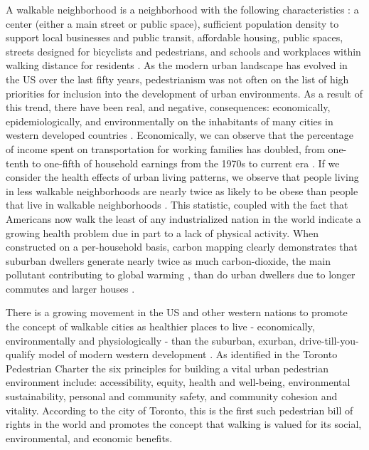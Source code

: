 \documentclass{llncs}
\begin{document}
A walkable neighborhood is a neighborhood with the following characteristics : a center (either a main street or public space), sufficient population density to support local businesses and public transit, affordable housing, public spaces, streets designed for bicyclists and pedestrians, and schools and workplaces within walking distance for residents \cite{wal2018walkable}. As the modern urban landscape has evolved in the US over the last fifty years, pedestrianism was not often on the list of high priorities for inclusion into the development of urban environments. As a result of this trend, there have been real, and negative, consequences: economically, epidemiologically, and environmentally on the inhabitants of many cities in western developed countries \cite{speck2013walkable}. Economically, we can observe that the percentage of income spent on transportation for working families has doubled, from one-tenth to one-fifth of household earnings from the 1970s to current era \cite{speck2013walkable}. If we consider the health effects of urban living patterns, we observe that people living in less walkable neighborhoods are nearly twice as likely to be obese than people that live in walkable neighborhoods \cite{speck2013walkable}. This statistic, coupled with the fact that Americans now walk the least of any industrialized nation in the world \cite{lee2014suburban} indicate a growing health problem due in part to a lack of physical activity. When constructed on a per-household basis, carbon mapping clearly demonstrates that suburban dwellers generate nearly twice as much carbon-dioxide, the main pollutant contributing to global warming \cite{climatendclimate}, than do urban dwellers due to longer commutes and larger houses \cite{speck2013walkable}.

There is a growing movement in the US and other western nations to promote the concept of walkable cities as healthier places to live - economically, environmentally and physiologically - than the suburban, exurban, drive-till-you-qualify model of modern western development \cite{leyden2003social} \cite{steffen2008worldchanging} \cite{doyle2006active}. As identified in the Toronto Pedestrian Charter \cite{toronto2002toronto} the six principles for building a vital urban pedestrian environment include: accessibility, equity, health and well-being, environmental sustainability, personal and community safety, and community cohesion and vitality. According to the city of Toronto, this is the first such pedestrian bill of rights in the world and promotes the concept that walking is valued for its social, environmental, and economic benefits.
\end{document}
